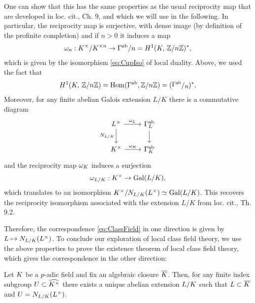 \documentclass[a4paper, oneside]{memoir}
\begin{document}
\begin{remark}
    One can show that this has the same properties as the usual reciprocity map that are developed in loc. cit., Ch. 9, and which we will use in the following. In particular, the reciprocity map is surjective, with dense image (by definition of the profinite completion) and if $n>0$ it induces a map
    \begin{equation}\label{eq:RecIso}
        \omega_n:K^\times / K^{\times n} \to \Gamma^{\text{ab}}/n = H^{1}( K, \, \mathbb{Z}/n\mathbb{Z} )^*,
    \end{equation}
    which is given by the isomorphism \eqref{eq:CupIso} of local duality. Above, we used the fact that $$\H{1}{\K}{\Zn}=
        \Hom(\Gamma^{\text{ab}},\Zn)=(\sfrac{\Gamma^{\text{ab}}}{n})^*.$$
    Moreover, for any finite abelian Galois extension $L / K$ there is a commutative diagram
    \[
        \begin{tikzcd}\label{eq:NormDiag}
            L^\times \ar[r, "\omega_L"] \ar[d, swap, "N_{L/\K}"] & \Gamma_L^{\text{ab}} \ar[d] \\
            K^\times \ar[r, "\omega_K"]       & \Gamma_K^{\text{ab}}
        \end{tikzcd}
    \]
    and the reciprocity map $\omega_K$ induces a surjection
    \[
        \omega_{L/K}:K^\times \to \operatorname{Gal}(L/K),
    \]
    which translates to an isomorphism $K^\times / N_{L/K}(L^\times) \simeq \operatorname{Gal}(L/K)$. This recovers the reciprocity isomorphism associated with the extension $L/K$ from loc. cit., Th. 9.2.
\end{remark}

Therefore, the correspondence \eqref{eq:ClassField} in one direction is given by $L \mapsto N_{L/K}(L^\times)$. To conclude our exploration of local class field theory, we use the above properties to prove the existence theorem of local class field theory, which gives the correspondence in the other direction:

\begin{theorem}
    Let $K$ be a $p$-adic field and fix an algebraic closure $\overline{K}$. Then, for any finite index subgroup $U\subset\widehat{K^\times}$
    there exists a unique abelian extension $L / K$ such that $L \subset \overline{K}$ and $U=N_{L/K}(L^\times)$.
\end{theorem}
\end{document}
